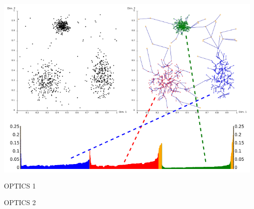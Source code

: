 \documentclass[aspectratio=169]{beamer}
\begin{document}
\begin{frame}{}

\begin{center}
\includegraphics[height=0.9\textheight]{images/optics.png}
\end{center}

\end{frame}

\begin{frame}{OPTICS 1}

\optics

\end{frame}

\begin{frame}{OPTICS 2}

\update

\end{frame}
\end{document}
